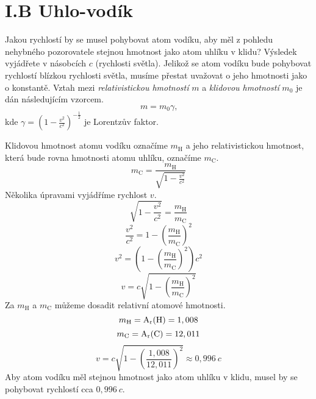 \documentclass{../../../../style/mkimain}
\begin{document}
\section*{I.B Uhlo-vodík}
\noindent Jakou rychlostí by se musel pohybovat atom vodíku, aby měl z pohledu nehybného pozorovatele stejnou hmotnost jako atom uhlíku v klidu? 
Výsledek vyjádřete v násobcích $c$ (rychlosti světla).
\klein
Jelikož se atom vodíku bude pohybovat rychlostí blízkou rychlosti světla, musíme přestat 
uvažovat o jeho hmotnosti jako o konstantě. Vztah mezi \emph{relativistickou hmotností} $m$ 
a \emph{klidovou hmotností} $m_0$ je dán následujícím vzorcem.
$$
m=m_0\gamma\text{,}
$$
kde $\gamma=\left(1-\frac{v^2}{c^2}\right)^{-\frac{1}{2}}$ je Lorentzův faktor.

Klidovou hmotnost atomu vodíku označíme $m_\mathrm{H}$ a jeho relativistickou hmotnost, která 
bude rovna hmotnosti atomu uhlíku, označíme $m_\mathrm{C}$. 
$$
m_\mathrm{C}=\frac{m_\mathrm{H}}{\sqrt{1-\frac{v^2}{c^2}}}
$$
Několika úpravami vyjádříme rychlost $v$.
$$
\sqrt{1-\frac{v^2}{c^2}}=\frac{m_\mathrm{H}}{m_\mathrm{C}}
$$
$$
\frac{v^2}{c^2}=1-\left(\frac{m_\mathrm{H}}{m_\mathrm{C}}\right)^2
$$
$$
v^2=\left(1-\left(\frac{m_\mathrm{H}}{m_\mathrm{C}}\right)^2\right)c^2
$$
$$
v=c\sqrt{1-\left(\frac{m_\mathrm{H}}{m_\mathrm{C}}\right)^2}
$$
Za $m_\mathrm{H}$ a $m_\mathrm{C}$ můžeme dosadit relativní atomové hmotnosti.
$$
m_\mathrm{H}=\mathrm{A_r(\ce{H})}=1,008
$$
$$
m_\mathrm{C}=\mathrm{A_r(\ce{C})}=12,011
$$
$$
v=c\sqrt{1-\left(\frac
{1,008}{12,011}\right)^2}\approx0,996\ c
$$
Aby atom vodíku měl stejnou hmotnost jako atom uhlíku v klidu, musel by se pohybovat rychlostí cca $0,996\ c$.\\
\end{document}
